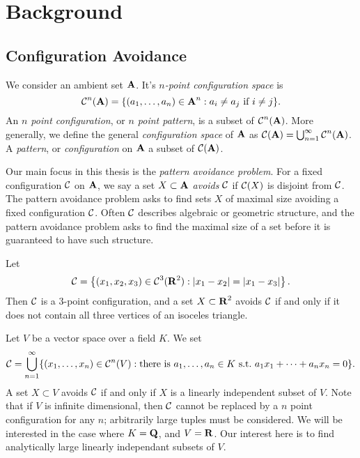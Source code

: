 
\chapter{Background}
\label{ch:Background}

\section{Configuration Avoidance}

We consider an ambient set $\operatorname{\mathbf{A}}$. It's \emph{$n$-point configuration space} is
%
\[ \operatorname{\mathcal{C}}^n(\operatorname{\mathbf{A}}) = \{ (a_1, \dots, a_n) \in \operatorname{\mathbf{A}}^n: a_i \neq a_j\ \text{if $i \neq j$} \}. \]
%
An \emph{$n$ point configuration}, or \emph{$n$ point pattern}, is a subset of $\operatorname{\mathcal{C}}^n(\operatorname{\mathbf{A}})$. More generally, we define the general \emph{configuration space} of $\operatorname{\mathbf{A}}$ as $\operatorname{\mathcal{C}}(\operatorname{\mathbf{A}}) = \bigcup_{n = 1}^\infty \operatorname{\mathcal{C}}^n(\operatorname{\mathbf{A}})$. A \emph{pattern}, or \emph{configuration} on $\operatorname{\mathbf{A}}$  a subset of $\operatorname{\mathcal{C}}(\operatorname{\mathbf{A}})$.

Our main focus in this thesis is the \emph{pattern avoidance problem}. For a fixed configuration $\operatorname{\mathcal{C}}$ on $\operatorname{\mathbf{A}}$, we say a set $X \subset \operatorname{\mathbf{A}}$ \emph{avoids} $\operatorname{\mathcal{C}}$ if $\operatorname{\mathcal{C}}(X)$ is disjoint from $\operatorname{\mathcal{C}}$. The pattern avoidance problem asks to find sets $X$ of maximal size avoiding a fixed configuration $\operatorname{\mathcal{C}}$. Often $\operatorname{\mathcal{C}}$ describes algebraic or geometric structure, and the pattern avoidance problem asks to find the maximal size of a set before it is guaranteed to have such structure.

\begin{example}
	Let
	\[ \operatorname{\mathcal{C}} = \left\{ (x_1, x_2, x_3) \in \operatorname{\mathcal{C}}^3(\operatorname{\mathbf{R}}^2) : |x_1-x_2| = |x_1-x_3| \right\}. \]
	Then $\operatorname{\mathcal{C}}$ is a 3-point configuration, and a set $X \subset \operatorname{\mathbf{R}}^2$ avoids $\operatorname{\mathcal{C}}$ if and only if it does not contain all three vertices of an isoceles triangle. %
\end{example}

\begin{example}
	Let $V$ be a vector space over a field $K$. We set
	\[ \C = \bigcup_{n = 1}^\infty \{ (x_1, \dots, x_n) \in \C^n(V): \text{there is}\ a_1, \dots, a_n \in K\ \text{s.t.}\ a_1x_1 + \dots + a_nx_n = 0 \}. \]
	A set $X \subset V$ avoids $\operatorname{\mathcal{C}}$ if and only if $X$ is a linearly independent subset of $V$. Note that if $V$ is infinite dimensional, then $\operatorname{\mathcal{C}}$ cannot be replaced by a $n$ point configuration for any $n$; arbitrarily large tuples must be considered. We will be interested in the case where $K = \operatorname{\mathbf{Q}}$, and $V = \operatorname{\mathbf{R}}$. Our interest here is to find analytically large linearly independant subsets of $V$.
\end{example}

